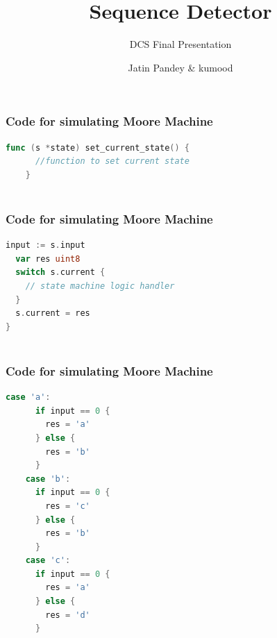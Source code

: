\documentclass[xcolor=table]{beamer}
\title[Sequence Detector]
{Sequence Detector}
\subtitle{DCS Final Presentation}
\institute{DTU}
\author{Jatin Pandey \& kumood}
\begin{document}
  \frame {
      \titlepage
    }
 \begin{frame}[fragile]
  \frametitle{Code for simulating Moore Machine}
  \begin{lstlisting}[language=go,keywordstyle=\bf,stringstyle=\it]
    func (s *state) set_current_state() {
      //function to set current state 
    }
    
  \end{lstlisting}

\end{frame} 

\begin{frame}[fragile]
  \frametitle{Code for simulating Moore Machine}
\begin{lstlisting}[language=go,keywordstyle=\bf,stringstyle=\it]
  input := s.input 
  var res uint8
  switch s.current {
    // state machine logic handler 
  }
  s.current = res
}
   
  \end{lstlisting}
\end{frame}

\begin{frame}[fragile]
  \frametitle{Code for simulating Moore Machine}
\begin{lstlisting}[language=go,keywordstyle=\bf,stringstyle=\it]
    case 'a':
      if input == 0 {
        res = 'a'
      } else {
        res = 'b'
      }
    case 'b':
      if input == 0 {
        res = 'c'
      } else {
        res = 'b'
      }
    case 'c':
      if input == 0 {
        res = 'a'
      } else {
        res = 'd'
      }
  
  \end{lstlisting}
\end{frame}
\end{document}
